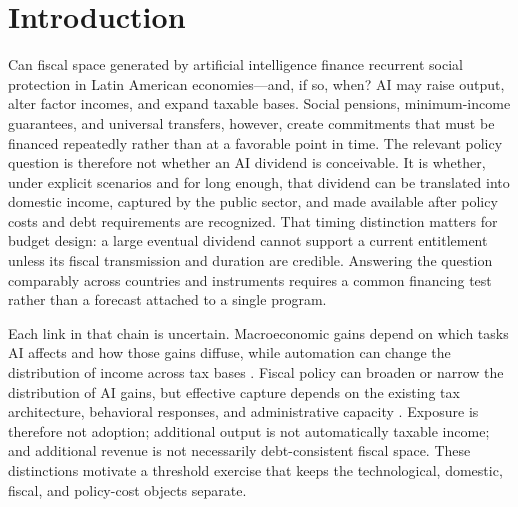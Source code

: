 \section{Introduction}\label{sec:introduction}

Can fiscal space generated by artificial intelligence finance recurrent social protection in Latin American economies---and, if so, when? AI may raise output, alter factor incomes, and expand taxable bases. Social pensions, minimum-income guarantees, and universal transfers, however, create commitments that must be financed repeatedly rather than at a favorable point in time. The relevant policy question is therefore not whether an AI dividend is conceivable. It is whether, under explicit scenarios and for long enough, that dividend can be translated into domestic income, captured by the public sector, and made available after policy costs and debt requirements are recognized. That timing distinction matters for budget design: a large eventual dividend cannot support a current entitlement unless its fiscal transmission and duration are credible. Answering the question comparably across countries and instruments requires a common financing test rather than a forecast attached to a single program.

Each link in that chain is uncertain. Macroeconomic gains depend on which tasks AI affects and how those gains diffuse, while automation can change the distribution of income across tax bases \citep{acemoglu2024simple,acemoglu2019automation}. Fiscal policy can broaden or narrow the distribution of AI gains, but effective capture depends on the existing tax architecture, behavioral responses, and administrative capacity \citep{brollo2024fiscal,korinek2026public,gaspar2016tax}. Exposure is therefore not adoption; additional output is not automatically taxable income; and additional revenue is not necessarily debt-consistent fiscal space. These distinctions motivate a threshold exercise that keeps the technological, domestic, fiscal, and policy-cost objects separate.

